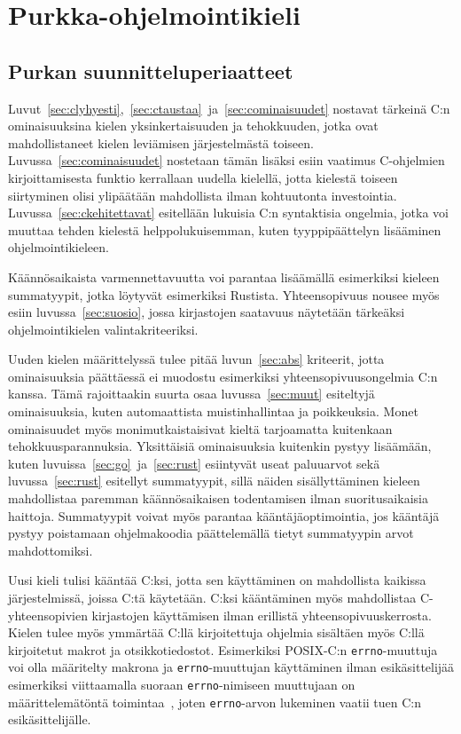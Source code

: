 \section{Purkka-ohjelmointikieli}
\label{sec:purkka}

\subsection{Purkan suunnitteluperiaatteet}

Luvut~\ref{sec:clyhyesti},~\ref{sec:ctaustaa}~ja~\ref{sec:cominaisuudet}
nostavat tärkeinä C:n ominaisuuksina kielen yksinkertaisuuden ja tehokkuuden,
jotka ovat mahdollistaneet kielen leviämisen järjestelmästä toiseen.
Luvussa~\ref{sec:cominaisuudet} nostetaan tämän lisäksi esiin vaatimus
C-ohjelmien kirjoittamisesta funktio kerrallaan uudella kielellä, jotta
kielestä toiseen siirtyminen olisi ylipäätään mahdollista ilman kohtuutonta
investointia. Luvussa~\ref{sec:ckehitettavat} esitellään lukuisia C:n
syntaktisia ongelmia, jotka voi muuttaa tehden kielestä helppolukuisemman,
kuten tyyppipäättelyn lisääminen ohjelmointikieleen.

Käännösaikaista varmennettavuutta voi parantaa lisäämällä esimerkiksi
kieleen summatyypit, jotka löytyvät esimerkiksi Rustista. Yhteensopivuus nousee
myös esiin luvussa~\ref{sec:suosio}, jossa kirjastojen saatavuus näytetään
tärkeäksi ohjelmointikielen valintakriteeriksi.

Uuden kielen määrittelyssä tulee pitää luvun~\ref{sec:abs} kriteerit, jotta
ominaisuuksia päättäessä ei muodostu esimerkiksi yhteensopivuusongelmia C:n
kanssa. Tämä rajoittaakin suurta osaa luvussa~\ref{sec:muut} esiteltyjä
ominaisuuksia, kuten automaattista muistinhallintaa ja poikkeuksia. Monet
ominaisuudet myös monimutkaistaisivat kieltä tarjoamatta kuitenkaan
tehokkuusparannuksia. Yksittäisiä ominaisuuksia kuitenkin pystyy lisäämään,
kuten luvuissa~\ref{sec:go}~ja~\ref{sec:rust} esiintyvät useat paluuarvot sekä
luvussa~\ref{sec:rust} esitellyt summatyypit, sillä näiden sisällyttäminen
kieleen mahdollistaa paremman käännösaikaisen todentamisen ilman
suoritusaikaisia haittoja. Summatyypit voivat myös parantaa
kääntäjäoptimointia, jos kääntäjä pystyy poistamaan ohjelmakoodia päättelemällä
tietyt summatyypin arvot mahdottomiksi.

Uusi kieli tulisi kääntää C:ksi, jotta sen käyttäminen on mahdollista kaikissa
järjestelmissä, joissa C:tä käytetään. C:ksi kääntäminen myös mahdollistaa
C-yhteensopivien kirjastojen käyttämisen ilman erillistä
yhteensopivuuskerrosta. Kielen tulee myös ymmärtää C:llä kirjoitettuja ohjelmia
sisältäen myös C:llä kirjoitetut makrot ja otsikkotiedostot. Esimerkiksi
POSIX-C:n \texttt{errno}-muuttuja voi olla määritelty makrona ja
\texttt{errno}-muuttujan käyttäminen ilman esikäsittelijää esimerkiksi
viittaamalla suoraan \texttt{errno}-nimiseen muuttujaan on määrittelemätöntä
toimintaa~\citep[s. 234]{POSIX}, joten \texttt{errno}-arvon lukeminen vaatii
tuen C:n esikäsittelijälle.

